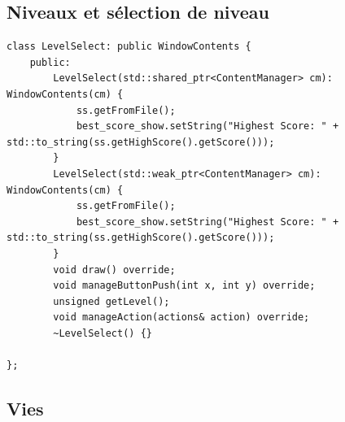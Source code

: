 \documentclass[a4paper, 12pt]{article}
\begin{document}
\subsection{Niveaux et sélection de niveau}
\begin{lstlisting}
class LevelSelect: public WindowContents {
    public:
        LevelSelect(std::shared_ptr<ContentManager> cm): WindowContents(cm) {
            ss.getFromFile();
            best_score_show.setString("Highest Score: " + std::to_string(ss.getHighScore().getScore()));
        }
        LevelSelect(std::weak_ptr<ContentManager> cm): WindowContents(cm) {
            ss.getFromFile();
            best_score_show.setString("Highest Score: " + std::to_string(ss.getHighScore().getScore()));
        }
        void draw() override;
        void manageButtonPush(int x, int y) override;
        unsigned getLevel();
        void manageAction(actions& action) override;
        ~LevelSelect() {}

};
\end{lstlisting}
\subsection{Vies}
\end{document}
